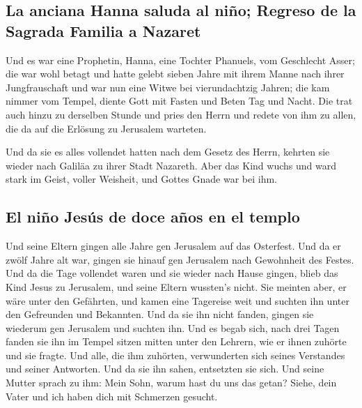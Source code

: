 \hypertarget{la-anciana-hanna-saluda-al-niuxf1o-regreso-de-la-sagrada-familia-a-nazaret}{%
\subsection{La anciana Hanna saluda al niño; Regreso de la Sagrada
Familia a
Nazaret}\label{la-anciana-hanna-saluda-al-niuxf1o-regreso-de-la-sagrada-familia-a-nazaret}}

 Und es war eine Prophetin, Hanna, eine Tochter Phanuels,
vom Geschlecht Asser; die war wohl betagt und hatte gelebt sieben Jahre
mit ihrem Manne nach ihrer Jungfrauschaft  und war nun
eine Witwe bei vierundachtzig Jahren; die kam nimmer vom Tempel, diente
Gott mit Fasten und Beten Tag und Nacht.  Die trat auch
hinzu zu derselben Stunde und pries den Herrn und redete von ihm zu
allen, die da auf die Erlösung zu Jerusalem warteten.

 Und da sie es alles vollendet hatten nach dem Gesetz des
Herrn, kehrten sie wieder nach Galiläa zu ihrer Stadt Nazareth.
 Aber das Kind wuchs und ward stark im Geist, voller
Weisheit, und Gottes Gnade war bei ihm.

\hypertarget{el-niuxf1o-jesuxfas-de-doce-auxf1os-en-el-templo}{%
\subsection{El niño Jesús de doce años en el
templo}\label{el-niuxf1o-jesuxfas-de-doce-auxf1os-en-el-templo}}

 Und seine Eltern gingen alle Jahre gen Jerusalem auf das
Osterfest.  Und da er zwölf Jahre alt war, gingen sie
hinauf gen Jerusalem nach Gewohnheit des Festes.  Und da
die Tage vollendet waren und sie wieder nach Hause gingen, blieb das
Kind Jesus zu Jerusalem, und seine Eltern wussten's nicht.
 Sie meinten aber, er wäre unter den Gefährten, und kamen
eine Tagereise weit und suchten ihn unter den Gefreunden und Bekannten.
 Und da sie ihn nicht fanden, gingen sie wiederum gen
Jerusalem und suchten ihn.  Und es begab sich, nach drei
Tagen fanden sie ihn im Tempel sitzen mitten unter den Lehrern, wie er
ihnen zuhörte und sie fragte.  Und alle, die ihm
zuhörten, verwunderten sich seines Verstandes und seiner Antworten.
 Und da sie ihn sahen, entsetzten sie sich. Und seine
Mutter sprach zu ihm: Mein Sohn, warum hast du uns das getan? Siehe,
dein Vater und ich haben dich mit Schmerzen gesucht.

